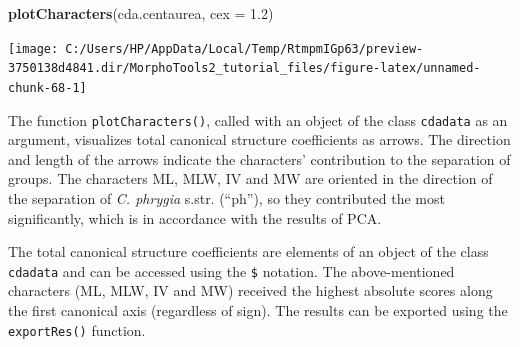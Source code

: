 \documentclass[
]{article}
\newenvironment{Shaded}{\begin{snugshade}}{\end{snugshade}}
\newcommand{\DataTypeTok}[1]{\textcolor[rgb]{0.13,0.29,0.53}{#1}}
\newcommand{\FloatTok}[1]{\textcolor[rgb]{0.00,0.00,0.81}{#1}}
\newcommand{\KeywordTok}[1]{\textcolor[rgb]{0.13,0.29,0.53}{\textbf{#1}}}
\newcommand{\NormalTok}[1]{#1}
\begin{document}
\begin{Shaded}
\begin{Highlighting}[]
\KeywordTok{plotCharacters}\NormalTok{(cda.centaurea, }\DataTypeTok{cex =} \FloatTok{1.2}\NormalTok{)}
\end{Highlighting}
\end{Shaded}

\begin{center}\texttt{[image: C:/Users/HP/AppData/Local/Temp/RtmpmIGp63/preview-3750138d4841.dir/MorphoTools2\_tutorial\_files/figure-latex/unnamed-chunk-68-1]} \end{center}

The function \texttt{plotCharacters()}, called with an object of the
class \texttt{cdadata} as an argument, visualizes total canonical
structure coefficients as arrows. The direction and length of the arrows
indicate the characters' contribution to the separation of groups. The
characters ML, MLW, IV and MW are oriented in the direction of the
separation of \emph{C. phrygia} s.str. (``ph''), so they contributed the
most significantly, which is in accordance with the results of PCA.

The total canonical structure coefficients are elements of an object of
the class \texttt{cdadata} and can be accessed using the \texttt{\$}
notation. The above-mentioned characters (ML, MLW, IV and MW) received
the highest absolute scores along the first canonical axis (regardless
of sign). The results can be exported using the \texttt{exportRes()}
function.
\end{document}
